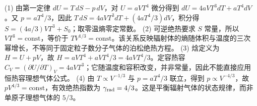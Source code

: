 (1) 由第一定律 \(dU=T\,dS-p\,dV\)，对 \(U=aVT^4\) 微分得到 \(dU=4aVT^3dT+aT^4dV\)。又 \(p=aT^4/3\)，因此 \(T\,dS=4aVT^3dT+(4aT^4/3)dV\)，积分得 \(S=(4a/3)VT^3+S_0\)；取零温熵零定常数。
(2) 可逆绝热要求 \(S\) 常量，所以 \(VT^3=\mathrm{const}\)，等价于 \(TV^{1/3}=\mathrm{const}\)。该关系反映辐射体的熵随体积与温度的三次幂增长，不等同于固定粒子数分子气体的泊松绝热方程。
(3) 焓定义为 \(H=U+pV\)，故 \(H=aVT^4+aVT^4/3=4aVT^4/3\)。定容热容 \(C_V=(\partial U/\partial T)_V=4aVT^3\)；它随温度和容积改变，并非常量，因此不能直接应用恒热容理想气体公式。
(4) 由 \(T\propto V^{-1/3}\) 与 \(p=aT^4/3\) 联立，得到 \(p\propto V^{-4/3}\)，故 \(pV^{4/3}=\mathrm{const}\)，有效绝热指数为 \(\gamma_{\rm rad}=4/3\)。这是平衡辐射气体的状态规律，而非单原子理想气体的 \(5/3\)。
